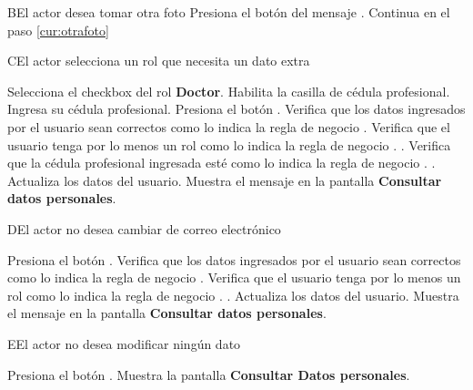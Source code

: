 \begin{UCtrayectoriaA}{B}{El actor desea tomar otra foto}
	\UCpaso [\UCactor] Presiona el botón  del mensaje .
	\UCpaso Continua en el paso \ref{cur:otrafoto}
\end{UCtrayectoriaA}


\begin{UCtrayectoriaA}{C}{El actor selecciona un rol que necesita un dato extra}
	
	\UCpaso [\UCactor] Selecciona el checkbox del rol \textbf{Doctor}.
	\UCpaso Habilita la casilla de cédula profesional.
	\UCpaso [\UCactor] Ingresa su cédula profesional. \label{Cedula}
	\UCpaso [\UCactor] Presiona el botón .
	\UCpaso Verifica que los datos ingresados por el usuario sean correctos como lo indica la regla de negocio . 
	\UCpaso Verifica que el usuario tenga por lo menos un rol como lo indica la regla de negocio . .
	\UCpaso Verifica que la cédula profesional ingresada esté como lo indica la regla de negocio . .
	\UCpaso Actualiza los datos del usuario.
	\UCpaso Muestra el mensaje  en la pantalla \textbf{Consultar datos personales}.
\end{UCtrayectoriaA}


\begin{UCtrayectoriaA}{D}{El actor no desea cambiar de correo electrónico}
	
	\UCpaso [\UCactor] Presiona el botón .
	\UCpaso Verifica que los datos ingresados por el usuario sean correctos como lo indica la regla de negocio . 
	\UCpaso Verifica que el usuario tenga por lo menos un rol como lo indica la regla de negocio . .
	\UCpaso Actualiza los datos del usuario.
	\UCpaso Muestra el mensaje  en la pantalla \textbf{Consultar datos personales}.
\end{UCtrayectoriaA}



\begin{UCtrayectoriaA}{E}{El actor no desea modificar ningún dato}
		
	\UCpaso [\UCactor] Presiona el botón .
	\UCpaso Muestra la pantalla \textbf{Consultar Datos personales}.

\end{UCtrayectoriaA}

